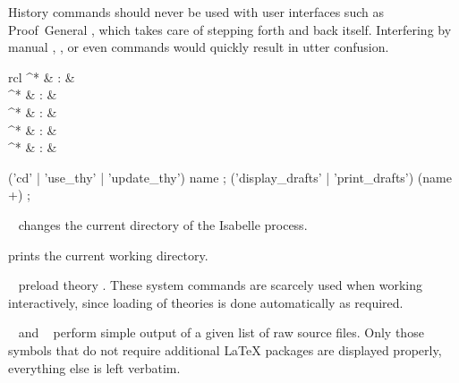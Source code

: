 \begin{isabellebody}
\begin{isamarkuptext}
  \begin{warn}
    History commands should never be used with user interfaces such as
    Proof~General \cite{proofgeneral,Aspinall:TACAS:2000}, which takes
    care of stepping forth and back itself.  Interfering by manual
    \mbox{}, \mbox{}, or even \mbox{}
    commands would quickly result in utter confusion.
  \end{warn}%
\end{isamarkuptext}%
\isamarkuptrue%
%
\isamarkuptrue%
%
\begin{isamarkuptext}%
\begin{matharray}{rcl}
    \mbox{}^* & : & \isarkeep{\cdot} \\
    \mbox{}^* & : & \isarkeep{\cdot} \\
    \mbox{}^* & : & \isarkeep{\cdot} \\
    \mbox{}^* & : & \isarkeep{\cdot} \\
    \mbox{}^* & : & \isarkeep{\cdot} \\
  \end{matharray}

  \begin{rail}
    ('cd' | 'use\_thy' | 'update\_thy') name
    ;
    ('display\_drafts' | 'print\_drafts') (name +)
    ;
  \end{rail}

  \begin{descr}

  \item [\mbox{\isa{\isacommand{cd}}}~\isa{path}] changes the current directory
  of the Isabelle process.

  \item [\mbox{\isa{\isacommand{pwd}}}] prints the current working directory.

  \item [\mbox{\isa{\isacommand{use{\isacharunderscore}thy}}}~\isa{A}] preload theory .
  These system commands are scarcely used when working interactively,
  since loading of theories is done automatically as required.

  \item [\mbox{\isa{\isacommand{display{\isacharunderscore}drafts}}}~\isa{paths} and \mbox{\isa{\isacommand{print{\isacharunderscore}drafts}}}~\isa{paths}] perform simple output of a given list
  of raw source files.  Only those symbols that do not require
  additional {\LaTeX} packages are displayed properly, everything else
  is left verbatim.


\end{descr}
\end{isamarkuptext}
\end{isabellebody}
